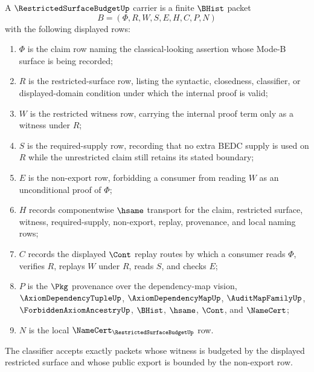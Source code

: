 \begin{definition}
\label{def:restricted-surface-budget-carrier}
A $\RestrictedSurfaceBudgetUp$ carrier is a finite $\BHist$ packet
$$
B=(\Phi,R,W,S,E,H,C,P,N)
$$
with the following displayed rows:
\begin{enumerate}
\item $\Phi$ is the claim row naming the classical-looking assertion whose
Mode-B surface is being recorded;
\item $R$ is the restricted-surface row, listing the syntactic, closedness,
classifier, or displayed-domain condition under which the internal proof is
valid;
\item $W$ is the restricted witness row, carrying the internal proof term only
as a witness under $R$;
\item $S$ is the required-supply row, recording that no extra BEDC supply is
used on $R$ while the unrestricted claim still retains its stated boundary;
\item $E$ is the non-export row, forbidding a consumer from reading $W$ as an
unconditional proof of $\Phi$;
\item $H$ records componentwise $\hsame$ transport for the claim, restricted
surface, witness, required-supply, non-export, replay, provenance, and local
naming rows;
\item $C$ records the displayed $\Cont$ replay routes by which a consumer
reads $\Phi$, verifies $R$, replays $W$ under $R$, reads $S$, and checks $E$;
\item $P$ is the $\Pkg$ provenance over the dependency-map vision,
$\AxiomDependencyTupleUp$, $\AxiomDependencyMapUp$, $\AuditMapFamilyUp$,
$\ForbiddenAxiomAncestryUp$, $\BHist$, $\hsame$, $\Cont$, and $\NameCert$;
\item $N$ is the local $\NameCert_{\RestrictedSurfaceBudgetUp}$ row.
\end{enumerate}
The classifier accepts exactly packets whose witness is budgeted by the
displayed restricted surface and whose public export is bounded by the
non-export row.
\end{definition}

